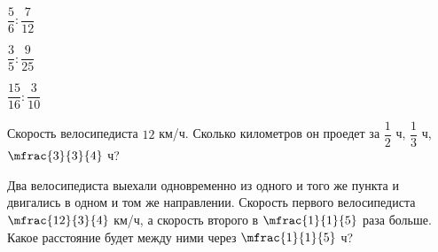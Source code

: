 \begin{class}[number=2]
\begin{listofex}
\begin{enumcols}[itemcolumns=4]
			\item \( \dfrac{5}{6}:\dfrac{7}{12} \)
			\item \( \dfrac{3}{5}:\dfrac{9}{25} \)
			\item \( \dfrac{15}{16}:\dfrac{3}{10} \)
		\end{enumcols}
		\item Скорость велосипедиста \( 12  \) км/ч. Сколько километров он проедет за \( \dfrac{1}{2} \) ч, \( \dfrac{1}{3} \) ч, \( \mfrac{3}{3}{4} \) ч?
		\item Два велосипедиста выехали одновременно из одного и того же пункта и двигались в
		одном и том же направлении. Скорость первого велосипедиста \( \mfrac{12}{3}{4} \) км/ч, а скорость второго в \( \mfrac{1}{1}{5} \) раза больше. Какое расстояние будет между ними через \( \mfrac{1}{1}{5} \) ч?
	\end{listofex}
\end{class}
%
%
